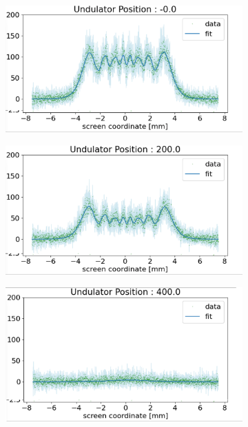 \documentclass[a4paper,11pt,uplatex]{jsbook}
\begin{document}
\begin{figure}
  \centering
  \begin{subfigure}[h]{0.45\linewidth}
    \centering
    \includegraphics[width=\linewidth]{image/4-double_0.png}
  \end{subfigure}
  \hfill
  \begin{subfigure}[h]{0.45\linewidth}
    \centering
    \includegraphics[width=\linewidth]{image/4-double_200.png}
  \end{subfigure}
  \begin{subfigure}[h]{0.45\linewidth}
    \centering
    \includegraphics[width=\linewidth]{image/4-double_400.png}

\end{subfigure}
\end{figure}
\end{document}

